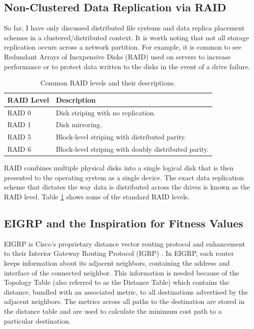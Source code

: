 \documentclass[12pt]{article}
\begin{document}
  \subsection{Non-Clustered Data Replication via RAID}

  So far, I have only discussed distributed file systems and data replica
  placement schemes in a clustered/distributed context. It is worth noting
  that not all storage replication occurs across a network partition. For
  example, it is common to see Redundant Arrays of Inexpensive Disks (RAID)
  \cite{raid} \cite{raid2} used on servers to increase performance or to
  protect data written to the disks in the event of a drive failure.

  \begin{table}[htbp]
    \caption{Common RAID levels and their descriptions.}
    \label{tbl:raid-levels}
    \begin{center}
    \begin{tabular}{ | l | l | }
      \hline
      \textbf{RAID Level} & \textbf{Description} \\ \hline
      RAID 0 & Disk striping with no replication. \\ \hline
      RAID 1 & Disk mirroring. \\ \hline
      RAID 5 & Block-level striping with distributed parity. \\ \hline
      RAID 6 & Block-level striping with doubly distributed parity. \\ \hline
      \hline
    \end{tabular}
    \end{center}
  \end{table}

  RAID combines multiple physical disks into a single logical disk that is then
  presented to the operating system as a single device. The exact data
  replication scheme that dictates the way data is distributed across the
  drives is known as the RAID level. Table \ref{tbl:raid-levels} shows some of
  the standard RAID levels.

  \subsection{EIGRP and the Inspiration for Fitness Values}
  \label{eigrp-motivation}

  EIGRP \cite{eigrp} is Cisco's proprietary distance vector
  \cite{distance-vector-1} routing protocol and enhancement to their Interior
  Gateway Routing Protocol (IGRP) \cite{igrp}. In EIGRP, each router keeps
  information about its adjacent neighbors, containing the address and interface
  of the connected neighbor. This information is needed because of the Topology
  Table (also referred to as the Distance Table) which contains the distance,
  bundled with an associated metric, to all destinations advertised by the
  adjacent neighbors. The metrics across all paths to the destination are
  stored in the distance table and are used to calculate the minimum cost path
  to a particular destination.
\end{document}
